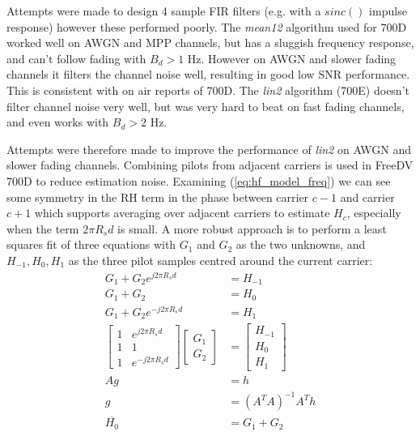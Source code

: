 \documentclass{article}
\begin{document}
Attempts were made to design 4 sample FIR filters (e.g. with a $sinc()$ impulse response) however these performed poorly. The \emph{mean12} algorithm used for 700D worked well on AWGN and MPP channels, but has a sluggish frequency response, and can't follow fading with $B_d>1$ Hz.  However on AWGN and slower fading channels it filters the channel noise well, resulting in good low SNR performance.  This is consistent with on air reports of 700D. The \emph{lin2} algorithm (700E) doesn't filter channel noise very well, but was very hard to beat on fast fading channels, and even works with $B_d>2$ Hz.

Attempts were therefore made to improve the performance of \emph{lin2} on AWGN and slower fading channels.  Combining pilots from adjacent carriers is used in FreeDV 700D to reduce estimation noise.  Examining (\ref{eq:hf_model_freq}) we can see some symmetry in the RH term in the phase between carrier $c-1$ and carrier $c+1$ which supports averaging over adjacent carriers to estimate $H_c$, especially when the term $2 \pi R_s d$ is small.  A more robust approach is to perform a least squares fit \cite{bergada2014digital} of three equations with $G_1$ and $G_2$ as the two unknowns, and $H_{-1}, H_0, H_1$ as the three pilot samples centred around the current carrier:
\begin{equation}
\label{eq:combine_freq}
\begin{split}
G_1 + G_2 e^{j 2 \pi R_sd} &= H_{-1} \\
G_1 + G_2 &= H_{0} \\
G_1 + G_2 e^{-j 2 \pi R_sd} &= H_{1} \\
\begin{bmatrix}
  1 & e^{j 2 \pi R_sd} \\
  1 & 1 \\
  1 & e^{-j 2 \pi R_sd}
\end{bmatrix} 
\begin{bmatrix}
  G_1 \\
  G_2
\end{bmatrix} 
&= \begin{bmatrix}
  H_{-1} \\
  H_{0} \\
  H_{1}
\end{bmatrix} \\
Ag &= h \\
 g &= (A^TA)^{-1}A^Th \\
 \overline{H_0} &= G_1 + G_2
\end{split}
\end{equation} 
\end{document}
